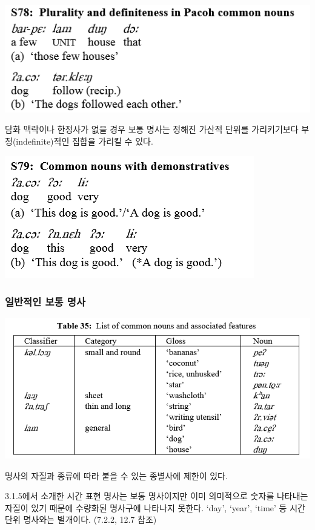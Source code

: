 \includegraphics{Pacoh/src/PacohS78.png}

담화 맥락이나 한정사가 없을 경우 보통 명사는 정해진 가산적 단위를 가리키기보다 부정(indefinite)적인 집합을 가리킬 수 있다.

\includegraphics{Pacoh/src/PacohS79.png}

\subsubsection{일반적인 보통 명사}

\includegraphics{Pacoh/src/PacohTable35.png}

명사의 자질과 종류에 따라 붙을 수 있는 종별사에 제한이 있다. 

3.1.5에서 소개한 시간 표현 명사는 보통 명사이지만 이미 의미적으로 숫자를 나타내는 자질이 있기 때문에 수량화된 명사구에 나타나지 못한다. `day', `year', `time' 등 시간 단위 명사와는 별개이다. (7.2.2, 12.7 참조)

